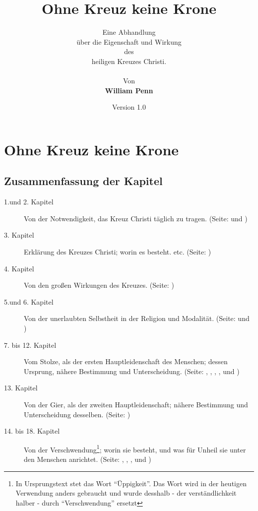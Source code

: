 \documentclass[a5paper,pagesize,9pt]{scrbook}
\begin{document}
\author{
Eine Abhandlung \\
über die Eigenschaft und Wirkung
\\
des
\\
heiligen Kreuzes Christi.
\\
\\
Von
\\
\textbf{William Penn}
}

\title{Ohne Kreuz keine Krone}
\date{Version 1.0}

\maketitle

\frontmatter

\tableofcontents




\mainmatter
\part{Ohne Kreuz keine Krone}



\chapter{Zusammenfassung der Kapitel}
\begin{description}
\item[1.und 2. Kapitel] Von der Notwendigkeit, das Kreuz Christi täglich zu
tragen. (Seite: \pageref{kap1} und  \pageref{kap2})
\item[3. Kapitel] Erklärung des Kreuzes Christi; worin es besteht. etc. (Seite:
\pageref{kap3})
\item[4. Kapitel] Von den großen Wirkungen des Kreuzes. (Seite: \pageref{kap4})
\item[5.und 6. Kapitel] Von der unerlaubten Selbstheit in der Religion und
Modalität. (Seite: \pageref{kap5} und \pageref{kap6})
\item[7. bis 12. Kapitel] Vom Stolze, als der ersten Hauptleidenschaft des
Menschen; dessen Ursprung, nähere Bestimmung und Unterscheidung. (Seite:
\pageref{kap7}, \pageref{kap8}, \pageref{kap9}, \pageref{kap10}, \pageref{kap11}
und \pageref{kap12})
\item[13. Kapitel] Von der Gier, als der zweiten Hauptleidenschaft; nähere
Bestimmung und Unterscheidung desselben. (Seite: \pageref{kap13})
\item[14. bis 18. Kapitel] Von der Verschwendung\footnote{In Ursprungstext stet
das Wort "`Üppigkeit"'. Das Wort wird in der heutigen Verwendung anders
gebraucht und wurde desshalb - der verständlichkeit halber - durch
"`Verschwendung"' ersetzt}; worin sie besteht, und was für Unheil sie unter den
Menschen anrichtet. (Seite: \pageref{kap14}, \pageref{kap15} , \pageref{kap16} ,
\pageref{kap17} und \pageref{kap18})
\end{description}
\end{document}

